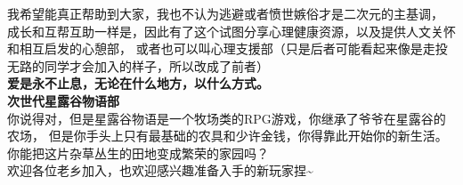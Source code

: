    \chind 我希望能真正帮助到大家，我也不认为逃避或者愤世嫉俗才是二次元的主基调，
成长和互帮互助一样是，因此有了这个试图分享心理健康资源，以及提供人文关怀和相互启发的心憩部，
或者也可以叫心理支援部（只是后者可能看起来像是走投无路的同学才会加入的样子，所以改成了前者）\\
\chind \textbf{爱是永不止息，无论在什么地方，以什么方式。}
\\  
\vspace{2em}    
\fontsize{23pt}{24pt}\selectfont
\textbf{\textcolor{truepurple}{次世代星露谷物语部}}\\
\vspace{0.2em}
\small
\chind 你说得对，但是星露谷物语是一个牧场类的RPG游戏，你继承了爷爷在星露谷的农场，
但是你手头上只有最基础的农具和少许金钱，你得靠此开始你的新生活。
你能把这片杂草丛生的田地变成繁荣的家园吗？\\
\chind 欢迎各位老乡加入，也欢迎感兴趣准备入手的新玩家捏\~{}
